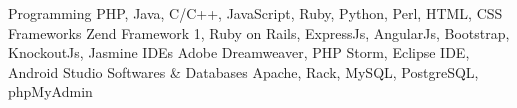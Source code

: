 \begin{cvskills}
  \cvskill
    {Programming}
    {PHP, Java, C/C++, JavaScript, Ruby, Python, Perl, HTML, CSS}
  \cvskill
  {Frameworks}
  {Zend Framework 1, Ruby on Rails, ExpressJs, AngularJs, Bootstrap, KnockoutJs, Jasmine}  
  \cvskill
  {IDEs}
  {Adobe Dreamweaver, PHP Storm, Eclipse IDE, Android Studio}  
  \cvskill
  {Softwares \& Databases}
  {Apache, Rack, MySQL, PostgreSQL, phpMyAdmin}      
    
\end{cvskills}
